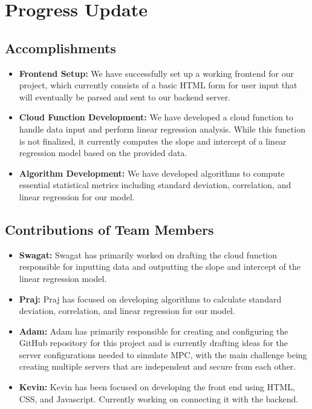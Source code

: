\documentclass[conference]{IEEEtran}
\begin{document}
\section{Progress Update}

\subsection*{Accomplishments}

\begin{itemize}
    \item \textbf{Frontend Setup:} We have successfully set up a working frontend for our project, which currently consists of a basic HTML form for user input that will eventually be parsed and sent to our backend server. 
    
    \item \textbf{Cloud Function Development:} We have developed a cloud function to handle data input and perform linear regression analysis. While this function is not finalized, it currently computes the slope and intercept of a linear regression model based on the provided data. 
    
    \item \textbf{Algorithm Development:} We have developed algorithms to compute essential statistical metrics including standard deviation, correlation, and linear regression for our model.~\cite{MPC1}
\end{itemize}

\subsection*{Contributions of Team Members}

\begin{itemize}
    \item \textbf{Swagat:} Swagat has primarily worked on drafting the cloud function responsible for inputting data and outputting the slope and intercept of the linear regression model.
    
    \item \textbf{Praj:} Praj has focused on developing algorithms to calculate standard deviation, correlation, and linear regression for our model.

    \item \textbf{Adam:} Adam has primarily responsible for creating and configuring the GitHub repository for this project and is currently drafting ideas for the server configurations needed to simulate MPC, with the main challenge being creating multiple servers that are independent and secure from each other. 
    
    \item \textbf{Kevin:} Kevin has been focused on developing the front end using HTML, CSS, and Javascript. Currently working on connecting it with the backend. 
\end{itemize}
\end{document}

